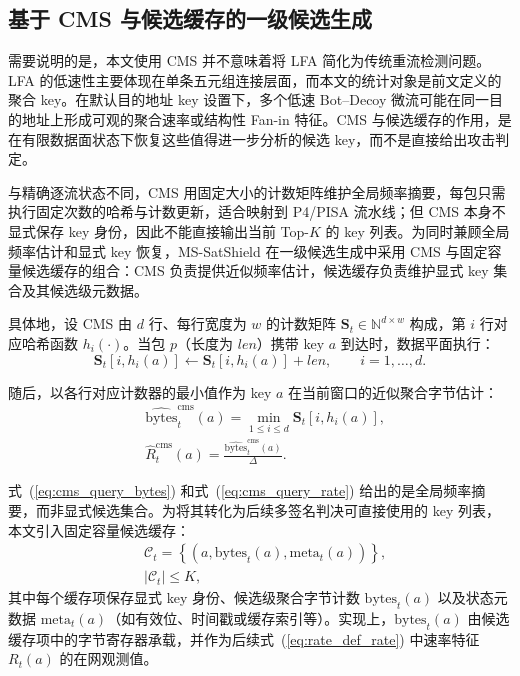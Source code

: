 \subsection{基于 CMS 与候选缓存的一级候选生成}
需要说明的是，本文使用 CMS 并不意味着将 LFA 简化为传统重流检测问题。LFA 的低速性主要体现在单条五元组连接层面，而本文的统计对象是前文定义的聚合 key。在默认目的地址 key 设置下，多个低速 Bot--Decoy 微流可能在同一目的地址上形成可观的聚合速率或结构性 Fan-in 特征。CMS 与候选缓存的作用，是在有限数据面状态下恢复这些值得进一步分析的候选 key，而不是直接给出攻击判定。

与精确逐流状态不同，CMS 用固定大小的计数矩阵维护全局频率摘要，每包只需执行固定次数的哈希与计数更新，适合映射到 P4/PISA 流水线；但 CMS 本身不显式保存 key 身份，因此不能直接输出当前 Top-$K$ 的 key 列表。为同时兼顾全局频率估计和显式 key 恢复，MS-SatShield 在一级候选生成中采用 CMS 与固定容量候选缓存的组合：CMS 负责提供近似频率估计，候选缓存负责维护显式 key 集合及其候选级元数据。

具体地，设 CMS 由 $d$ 行、每行宽度为 $w$ 的计数矩阵 $\mathbf{S}_t\in\mathbb{N}^{d\times w}$ 构成，第 $i$ 行对应哈希函数 $h_i(\cdot)$。当包 $p$（长度为 $len$）携带 key $a$ 到达时，数据平面执行：
\begin{equation}
\mathbf{S}_t[i,h_i(a)] \leftarrow \mathbf{S}_t[i,h_i(a)] + len,\qquad i=1,\ldots,d.
\label{eq:cms_update}
\end{equation}

随后，以各行对应计数器的最小值作为 key $a$ 在当前窗口的近似聚合字节估计：
\begin{subequations}\label{eq:cms_query}
\begin{align}
&\widehat{\text{bytes}}^{\mathrm{cms}}_t(a) = \min_{1\le i\le d}\mathbf{S}_t[i,h_i(a)],
\label{eq:cms_query_bytes}\\[0.35em]
&\widehat{R}^{\mathrm{cms}}_t(a) = \frac{\widehat{\text{bytes}}^{\mathrm{cms}}_t(a)}{\Delta}.
\label{eq:cms_query_rate}
\end{align}
\end{subequations}

式~(\ref{eq:cms_query_bytes}) 和式~(\ref{eq:cms_query_rate}) 给出的是全局频率摘要，而非显式候选集合。为将其转化为后续多签名判决可直接使用的 key 列表，本文引入固定容量候选缓存：
\begin{subequations}\label{eq:candidate_cache}
\begin{align}
&\mathcal{C}_t = \left\{(a,\text{bytes}_t(a),\text{meta}_t(a))\right\},
\label{eq:candidate_cache_def}\\[0.35em]
&|\mathcal{C}_t| \le K,
\label{eq:candidate_cache_bound}
\end{align}
\end{subequations}
其中每个缓存项保存显式 key 身份、候选级聚合字节计数 $\text{bytes}_t(a)$ 以及状态元数据 $\text{meta}_t(a)$（如有效位、时间戳或缓存索引等）。实现上，$\text{bytes}_t(a)$ 由候选缓存项中的字节寄存器承载，并作为后续式~(\ref{eq:rate_def_rate}) 中速率特征 $R_t(a)$ 的在网观测值。

